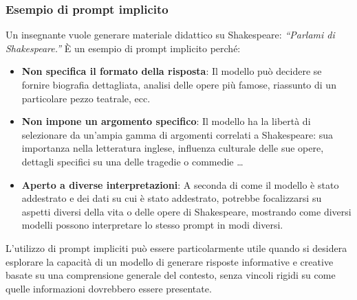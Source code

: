         \subsubsection{Esempio di prompt implicito}
            Un insegnante vuole generare materiale didattico su Shakespeare: \textit{``Parlami di Shakespeare.''} È un esempio di prompt implicito perché:
            \begin{itemize}
                \item \textbf{Non specifica il formato della risposta}: Il modello può decidere se fornire biografia dettagliata, analisi delle opere più famose, riassunto di un particolare pezzo teatrale, ecc.
                
                \item \textbf{Non impone un argomento specifico}: Il modello ha la libertà di selezionare da un'ampia gamma di argomenti correlati a Shakespeare: sua importanza nella letteratura inglese, influenza culturale delle sue opere, dettagli specifici su una delle tragedie o commedie …
                
                \item \textbf{Aperto a diverse interpretazioni}: A seconda di come il modello è stato addestrato e dei dati su cui è stato addestrato, potrebbe focalizzarsi su aspetti diversi della vita o delle opere di Shakespeare, mostrando come diversi modelli possono interpretare lo stesso prompt in modi diversi.
            \end{itemize}

            L'utilizzo di prompt impliciti può essere particolarmente utile quando si desidera esplorare la capacità di un modello di generare risposte informative e creative basate su una comprensione generale del contesto, senza vincoli rigidi su come quelle informazioni dovrebbero essere presentate.
            
